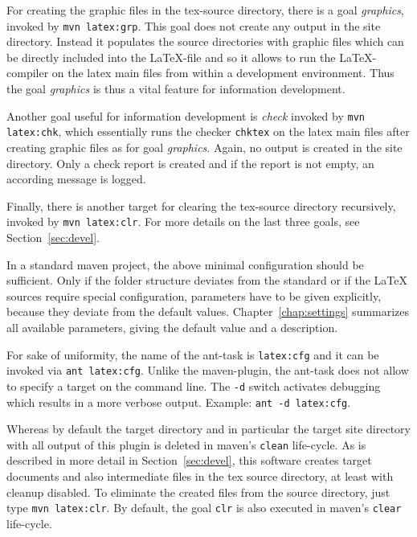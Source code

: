 \documentclass[12pt]{book}
\begin{document}
For creating the graphic files in the tex-source directory, 
there is a goal {\em graphics}, invoked by \texttt{mvn latex:grp}. 
This goal does not create any output in the site directory. 
Instead it populates the source directories 
with graphic files which can be directly included into the \LaTeX-file 
and so it allows to run the \LaTeX-compiler on the latex main files 
from within a development environment. 
Thus the goal {\em graphics\/} is thus a vital feature 
for information development. 

Another goal useful for information development is {\em check\/} 
invoked by \texttt{mvn latex:chk}, 
which essentially runs the checker \texttt{chktex} on the latex main files 
after creating graphic files as for goal {\em graphics}. 
Again, no output is created in the site directory. 
Only a check report is created and if the report is not empty, 
an according message is logged. 

Finally, there is another target for clearing the tex-source directory 
recursively, invoked by \texttt{mvn latex:clr}. 
For more details on the last three goals, see Section~\ref{sec:devel}. 

In a standard maven project, 
the above minimal configuration should be sufficient. 
Only if the folder structure deviates from the standard 
or if the \LaTeX{} sources require special configuration, 
parameters have to be given explicitly, 
because they deviate from the default values. 
Chapter~\ref{chap:settings} summarizes all available parameters, 
giving the default value and a description. 


For sake of uniformity, 
the name of the ant-task is \texttt{latex:cfg} 
and it can be invoked via \texttt{ant latex:cfg}. 
Unlike the maven-plugin, the ant-task 
does not allow to specify a target on the command line. 
The \texttt{-d} switch activates debugging 
which results in a more verbose output. 
Example: \texttt{ant -d latex:cfg}. 

Whereas by default the target directory and in particular 
the target site directory with all output of this plugin is deleted 
in maven's \texttt{clean} life-cycle. 
As is described in more detail in Section~\ref{sec:devel}, 
this software creates target documents and also intermediate files 
in the tex source directory, at least with cleanup disabled. 
To eliminate the created files from the source directory, 
just type \texttt{mvn latex:clr}. 
By default, the goal \texttt{clr} 
is also executed in maven's \texttt{clear} life-cycle. 
\end{document}

